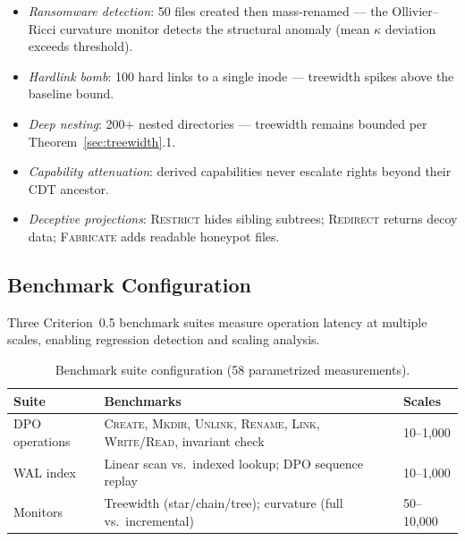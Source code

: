 \documentclass[11pt,a4paper]{article}
\theoremstyle{definition}
\begin{document}
\begin{itemize}[nosep]
  \item \textit{Ransomware detection}: 50 files created then mass-renamed ---
        the Ollivier--Ricci curvature monitor detects the structural anomaly
        (mean $\kappa$ deviation exceeds threshold).
  \item \textit{Hardlink bomb}: 100 hard links to a single inode ---
        treewidth spikes above the baseline bound.
  \item \textit{Deep nesting}: 200+ nested directories --- treewidth remains
        bounded per Theorem~\ref{sec:treewidth}.1.
  \item \textit{Capability attenuation}: derived capabilities never escalate
        rights beyond their CDT ancestor.
  \item \textit{Deceptive projections}: \textsc{Restrict} hides sibling
        subtrees; \textsc{Redirect} returns decoy data; \textsc{Fabricate}
        adds readable honeypot files.
\end{itemize}

\subsection{Benchmark Configuration}\label{sec:benchmarks}

Three Criterion~0.5 benchmark suites measure operation latency at multiple
scales, enabling regression detection and scaling analysis.

\begin{table}[h]
\centering
\caption{Benchmark suite configuration (58 parametrized measurements).}
\label{tab:benchmarks}
\begin{tabularx}{\textwidth}{lXl}
\toprule
\textbf{Suite} & \textbf{Benchmarks} & \textbf{Scales} \\
\midrule
DPO operations & \textsc{Create}, \textsc{Mkdir}, \textsc{Unlink}, \textsc{Rename}, \textsc{Link}, \textsc{Write/Read}, invariant check & 10--1{,}000 \\
WAL index      & Linear scan vs.\ indexed lookup; DPO sequence replay & 10--1{,}000 \\
Monitors       & Treewidth (star/chain/tree); curvature (full vs.\ incremental) & 50--10{,}000 \\
\bottomrule
\end{tabularx}
\end{table}
\end{document}
